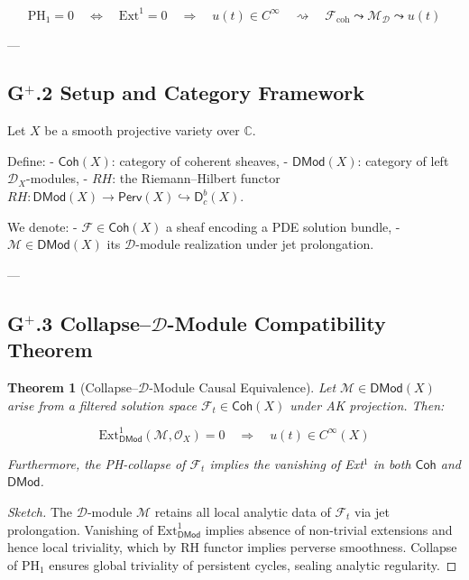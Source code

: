 \documentclass[11pt]{article}
\newtheorem{theorem}{Theorem}[section]
\begin{document}
\[
\boxed{
\mathrm{PH}_1 = 0 \quad \Leftrightarrow \quad \mathrm{Ext}^1 = 0 \quad \Rightarrow \quad u(t) \in C^\infty
}
\quad \rightsquigarrow \quad
\boxed{
\mathcal{F}_{\mathrm{coh}} \leadsto \mathcal{M}_{\mathcal{D}} \leadsto u(t)
}
\]

---

\subsection*{G$^+$.2 Setup and Category Framework}

Let $X$ be a smooth projective variety over $\mathbb{C}$.

Define:
- $\mathsf{Coh}(X)$: category of coherent sheaves,
- $\mathsf{DMod}(X)$: category of left $\mathcal{D}_X$-modules,
- $RH$: the Riemann–Hilbert functor \( RH: \mathsf{DMod}(X) \to \mathsf{Perv}(X) \hookrightarrow \mathsf{D}^b_c(X) \).

We denote:
- $\mathcal{F} \in \mathsf{Coh}(X)$ a sheaf encoding a PDE solution bundle,
- $\mathcal{M} \in \mathsf{DMod}(X)$ its $\mathcal{D}$-module realization under jet prolongation.

---

\subsection*{G$^+$.3 Collapse–$\mathcal{D}$-Module Compatibility Theorem}

\begin{theorem}[Collapse–$\mathcal{D}$-Module Causal Equivalence]
Let $\mathcal{M} \in \mathsf{DMod}(X)$ arise from a filtered solution space $\mathcal{F}_t \in \mathsf{Coh}(X)$ under AK projection.  
Then:

\[
\mathrm{Ext}^1_{\mathsf{DMod}}(\mathcal{M}, \mathcal{O}_X) = 0
\quad \Rightarrow \quad
u(t) \in C^\infty(X)
\]

Furthermore, the PH-collapse of $\mathcal{F}_t$ implies the vanishing of Ext$^1$ in both $\mathsf{Coh}$ and $\mathsf{DMod}$.
\end{theorem}

\begin{proof}[Sketch]
The $\mathcal{D}$-module $\mathcal{M}$ retains all local analytic data of $\mathcal{F}_t$ via jet prolongation.  
Vanishing of $\mathrm{Ext}^1_{\mathsf{DMod}}$ implies absence of non-trivial extensions and hence local triviality,  
which by RH functor implies perverse smoothness.  
Collapse of $\mathrm{PH}_1$ ensures global triviality of persistent cycles, sealing analytic regularity.
\end{proof}
\end{document}
